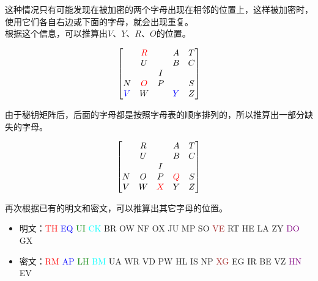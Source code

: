 这种情况只有可能发现在被加密的两个字母出现在相邻的位置上，这样被加密时，使用它们各自右边或下面的字母，就会出现重复。\\

根据这个信息，可以推算出$ V $、$ Y $、$ R $、$ O $的位置。

\[
    \begin{bmatrix}
                            & \textcolor{red}{R} &   & A                   & T \\
                            & U                  &   & B                   & C \\
                            &                    & I &                     &   \\
        N                   & \textcolor{red}{O} & P &                     & S \\
        \textcolor{blue}{V} & W                  &   & \textcolor{blue}{Y} & Z
    \end{bmatrix}
\]

\vspace{0.5cm}

由于秘钥矩阵后，后面的字母都是按照字母表的顺序排列的，所以推算出一部分缺失的字母。

\[
    \begin{bmatrix}
          & R &                    & A                  & T \\
          & U &                    & B                  & C \\
          &   & I                  &                    &   \\
        N & O & P                  & \textcolor{red}{Q} & S \\
        V & W & \textcolor{red}{X} & Y                  & Z
    \end{bmatrix}
\]

\vspace{0.5cm}

再次根据已有的明文和密文，可以推算出其它字母的位置。

\begin{itemize}
    \item 明文：\textcolor{red}{TH} \textcolor{blue}{EQ} \textcolor{green}{UI} \textcolor{cyan}{CK} BR OW NF OX JU MP SO \textcolor{brown}{VE} RT HE LA ZY \textcolor{purple}{DO} GX
    \item 密文：\textcolor{red}{RM} \textcolor{blue}{AP} \textcolor{green}{LH} \textcolor{cyan}{BM} UA WR VD PW HL IS NP \textcolor{brown}{XG} EG IR BE VZ \textcolor{purple}{HN} EV
\end{itemize}

